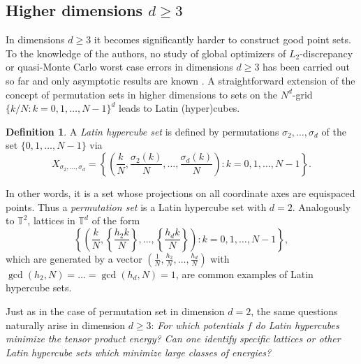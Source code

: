 \documentclass[a4paper,12pt]{article}
\numberwithin{equation}{section}
\theoremstyle{definition}
\newtheorem{defi}[thm]{Definition}
\newcommand{\bbT}{\mathbb{T}}
\begin{document}
\subsection{Higher dimensions $d\ge 3$} 
In dimensions $d \geq 3$ it becomes significantly harder to construct good point sets. To the knowledge of the authors, no study of global optimizers of $L_2$-discrepancy or quasi-Monte Carlo worst case errors in dimensions $d \geq 3$ has been carried out so far and only asymptotic results are known \cite{CS02, GSY16a}. A straightforward extension of the concept of permutation sets in higher dimensions to sets on the $N^d$-grid $\{k/N: k=0, 1, \dots, N-1\}^d$ leads to Latin (hyper)cubes.

\begin{defi} \label{def:lat_hypcube}
    A \emph{Latin hypercube set} is defined by permutations $\sigma_2, \dots, \sigma_d$ of the set $\{0, 1, \dots, N-1\}$ via
    $$
    X_{\sigma_2, \dots, \sigma_d} = \left\{\left(\frac{k}{N}, \frac{\sigma_2 (k) }{N}, \dots, \frac{\sigma_d(k)}N\right): k=0, 1, \dots, N-1\right\}.
    $$
\end{defi}
In other words, it is a set whose projections on all coordinate axes are equispaced points.  Thus a {\emph{permutation set}} is a Latin hypercube set with $d=2$. 
Analogously to $\mathbb T^2$, lattices in $\bbT^d$ of the form 
$$\left\{\left(\frac{k}{N}, \left\{ \frac{h_2 k }{N}\right\} , \dots, \left\{ \frac{h_{d} k}N \right\} \right): k=0, 1, \dots, N-1\right\},
 $$ which are generated by a vector
$
\left(\frac1N, \frac{h_2}N, \dots, \frac{h_d}N\right)
$
with  $\gcd(h_2, N) = \dots = \gcd(h_d, N) = 1$, are common examples of Latin hypercube sets. %

Just as in the case of permutation set in dimension $d=2$,  the  same questions naturally arise in dimension $d\ge 3$: {\emph{For which potentials $f$ do  Latin hypercubes  minimize the tensor product energy? Can one identify specific lattices or other Latin hypercube sets which minimize large classes of energies?}}  
\end{document}
